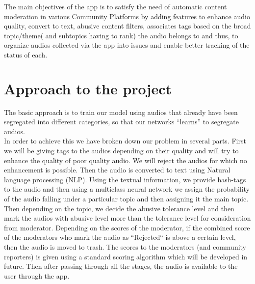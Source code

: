 \documentclass[11pt]{article}
\begin{document}
    The main objectives of the app is to satisfy the need of automatic content moderation in various Community Platforms by adding features to enhance audio quality, convert to text, abusive content filters, associates tags based on the broad topic/theme( and subtopics having to rank) the audio belongs to and thus, to organize audios collected via the app into issues and enable better tracking of the status of each.


\section{Approach to the project}
		The basic approach is to train our model using audios that already have been segregated into different categories, so that our networks ``learns'' to segregate audios.\\
		In order to achieve this we have broken down our problem in several parts. First we will be giving tags to the audios depending on their quality and will try to enhance the quality of poor quality audio. We will reject the audios for which no enhancement is possible. Then the audio is converted to text using Natural language processing (NLP). Using the textual information, we provide hash-tags to the audio and then using a multiclass neural network we assign the probability of the audio falling under a particular topic and  then assigning it the main topic. Then depending on the topic, we decide the abusive tolerance level and then mark the audios with abusive level more than the tolerance level for consideration from moderator. Depending on the scores of the moderator, if the combined score of the moderators who mark the audio as ``Rejected`` is above a certain level, then the audio is moved to trash. The scores to the moderators (and community reporters) is given using a standard scoring algorithm which will be developed in future. Then after passing through all the stages, the audio is available to the user through the app.
\end{document}
